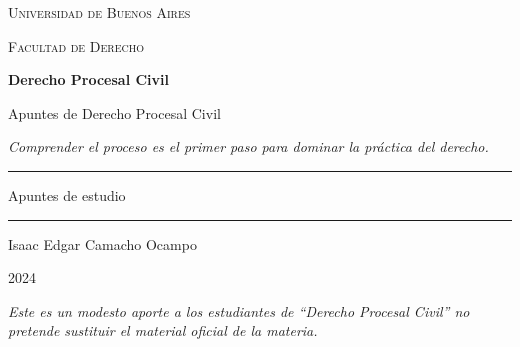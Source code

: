 \documentclass[12pt,oneside]{book}
\newcommand{\universidad}{Universidad de Buenos Aires}
\newcommand{\facultad}{Facultad de Derecho}
\newcommand{\materia}{Derecho Procesal Civil}
\newcommand{\titulo}{Apuntes de Derecho Procesal Civil}
\newcommand{\autor}{Isaac Edgar Camacho Ocampo}
\newcommand{\anio}{2024}
\begin{document}
\begin{titlepage}

\thispagestyle{empty}

\begin{center}

\vspace*{1cm}

{\large \textsc{\universidad}}

\vspace{0.2cm}

{\large \textsc{\facultad}}

\vspace{3cm}

{\Huge \textbf{\materia}}

\vspace{1cm}

{\LARGE \titulo}

\vspace{0.8cm}

\textit{Comprender el proceso es el primer paso para dominar la práctica del derecho.}

\vspace{1.2cm}

\rule{0.70\textwidth}{0.5pt}

\vspace{0.5cm}

{\large Apuntes de estudio}

\vspace{0.5cm}

\rule{0.70\textwidth}{0.5pt}

\vfill

{\large \autor}

\vspace{0.3cm}

{\large \anio}

\end{center}

\vfill

\begin{flushleft}
\textit{Este es un modesto aporte a los estudiantes de ``Derecho Procesal Civil'' no pretende sustituir el material oficial de la materia.}
\end{flushleft}

\end{titlepage}

\tableofcontents

\end{document}
